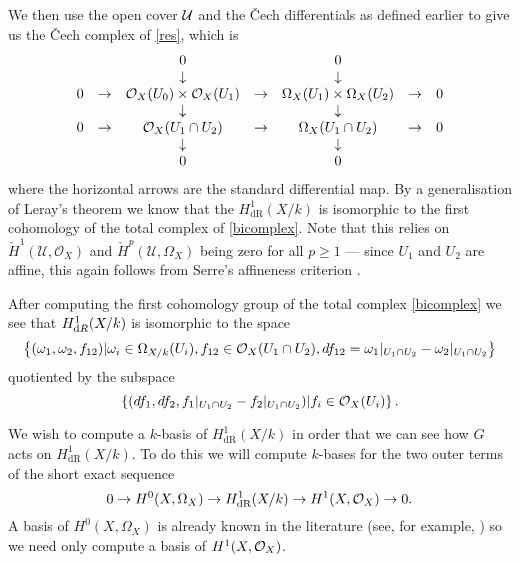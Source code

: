 \documentclass[draft, 11pt]{article} %
\theoremstyle{plain}
\theoremstyle{remark}
\newcommand{\cO}{{\cal O}}
\newcommand{\ra}{\rightarrow}
\newcommand{\cU}{{\mathcal U}}
\newcommand{\cech}{\v{C}ech }
\newcommand{\cechhone}{\check{H}^1(\mathcal U,\mathcal O_X)}
\newcommand{\derhamhone}{H_{\text {dR}}^1(X/k)}
\begin{document}
We then use the open cover $\cal U$ and the \cech differentials as defined earlier to give us the \cech complex of \eqref{res}, which is
\begin{equation}\label{bicomplex} \begin{array}{ccccccc}
~ & ~ & 0 & ~ & 0 & ~ & ~ \\
~ & ~ & \downarrow & ~ & \downarrow & ~ & ~ \\
0 & \rightarrow & \cO_X(U_0)\times \cO_X(U_1) & \rightarrow & \Omega_X(U_1)\times \Omega_X(U_2) & \rightarrow & 0 \\
~ & ~ & \downarrow & ~ & \downarrow & ~ & ~ \\
0 & \rightarrow & \cO_X(U_1 \cap U_2) & \rightarrow & \Omega_X(U_1 \cap U_2) & \rightarrow & 0 \\
~ & ~ & \downarrow & ~ & \downarrow & ~ & ~ \\
~ & ~ & 0 & ~ & 0 & ~ & ~ \\
\end{array}
\end{equation}
where the horizontal arrows are the standard differential map.
By a generalisation of Leray's theorem \cite[Cor. 12.4.7]{EGA0III} we know that the $\derhamhone$ is isomorphic to the first cohomology of the total complex of \eqref{bicomplex}.
Note that this relies on $\cechhone$ and ${\check H}^p(\cU, \Omega_X)$ being zero for all $p\geq 1$ ---
since $U_1$ and $U_2$ are affine, this again follows from Serre's affineness criterion \cite[Thm 5.2.23]{liu}.



After computing the first cohomology group of the total complex \eqref{bicomplex} we see that $H^1_{{\text dR}}(X/k)$ is isomorphic to the space
\begin{equation}\label{derhamconditions}
\left\{(\omega_1, \omega_2, f_{12}) | \omega_i\in \Omega_{X/k}(U_i), f_{12}\in \cO_X(U_1 \cap U_2), df_{12} = \omega_1|_{U_1\cap U_2} - \omega_2|_{U_1\cap U_2} \right\}
\end{equation}
quotiented by the subspace
\[
\left\{  (df_1, df_2, f_1|_{U_1\cap U_2} -f_2|_{U_1\cap U_2} )|f_i \in \cO_X(U_i)\right\}.
\]

We wish to compute a $k$-basis of $\derhamhone$ in order that we can see how $G$ acts on $\derhamhone$.
To do this we will compute $k$-bases for the two outer terms of the short exact sequence
\begin{equation}\label{ses}
0 \ra H^0(X,\Omega_X) \ra \derhamhone \ra H^1(X,\cO_X) \ra 0.
\end{equation}
A basis of $H^0(X,\Omega_X)$ is already known in the literature (see, for example, \cite[Prop. 7.4.26]{liu}) so we need only compute a basis of $H^1(X,\cO_X)$.
\end{document}
